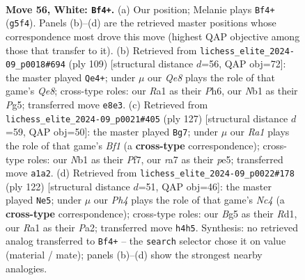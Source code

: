 \documentclass[11pt]{article}
\begin{document}
\clearpage

\begin{figure}[p]\centering
\begin{subfigure}{0.46\textwidth}\centering
\resizebox{\linewidth}{!}{%
\newchessgame
\chessboard[
  setfen={1qb1Q3/r7/3k4/p2p1pB1/P6P/8/8/RN4K1 w - - 2 56},
  showmover=false,
  pgfstyle=straightmove, color=movearrow, markmove={g5-f4}
]}
\caption{}
\end{subfigure}\hfill
\begin{subfigure}{0.46\textwidth}\centering
\resizebox{\linewidth}{!}{%
\newchessgame
\chessboard[
  setfen={8/1p6/6kp/6p1/P7/6QP/5P2/3rq1BK b - - 0 55},
  showmover=false,
  pgfstyle=straightmove, color=movearrow, markmove={e1-e4}
]}
\caption{}
\end{subfigure}
\\[4pt]
\begin{subfigure}{0.46\textwidth}\centering
\resizebox{\linewidth}{!}{%
\newchessgame
\chessboard[
  setfen={5bk1/5p2/7p/1p2PQ1P/3P4/8/q1B2K2/8 b - - 0 64},
  showmover=false,
  pgfstyle=straightmove, color=movearrow, markmove={f8-g7}
]}
\caption{}
\end{subfigure}\hfill
\begin{subfigure}{0.46\textwidth}\centering
\resizebox{\linewidth}{!}{%
\newchessgame
\chessboard[
  setfen={8/4r2k/p6p/3Q1bq1/2NP4/5P2/PP3K2/3R4 w - - 30 62},
  showmover=false,
  pgfstyle=straightmove, color=movearrow, markmove={c4-e5}
]}
\caption{}
\end{subfigure}
\caption{\textbf{Move 56, White: \texttt{Bf4+}.} (a) Our position; Melanie plays \texttt{Bf4+} (\texttt{g5f4}). Panels (b)--(d) are the retrieved master positions whose correspondence most drove this move (highest QAP objective among those that transfer to it). (b) Retrieved from \texttt{lichess\_elite\_2024-09\_p0018\#694} (ply 109) [structural distance $d$=56, QAP obj=72]: the master played \texttt{Qe4+}; under $\mu$ our \emph{Qe8} plays the role of that game's \emph{Qe8}; cross-type roles: our \emph{R}a1 as their \emph{P}h6, our \emph{N}b1 as their \emph{P}g5; transferred move \texttt{e8e3}. (c) Retrieved from \texttt{lichess\_elite\_2024-09\_p0021\#405} (ply 127) [structural distance $d$=59, QAP obj=50]: the master played \texttt{Bg7}; under $\mu$ our \emph{Ra1} plays the role of that game's \emph{Bf1} (a \textbf{cross-type} correspondence); cross-type roles: our \emph{N}b1 as their \emph{P}f7, our \emph{r}a7 as their \emph{p}e5; transferred move \texttt{a1a2}. (d) Retrieved from \texttt{lichess\_elite\_2024-09\_p0022\#178} (ply 122) [structural distance $d$=51, QAP obj=46]: the master played \texttt{Ne5}; under $\mu$ our \emph{Ph4} plays the role of that game's \emph{Nc4} (a \textbf{cross-type} correspondence); cross-type roles: our \emph{B}g5 as their \emph{R}d1, our \emph{R}a1 as their \emph{P}a2; transferred move \texttt{h4h5}. Synthesis: no retrieved analog transferred to \texttt{Bf4+} -- the \texttt{search} selector chose it on value (material / mate); panels (b)--(d) show the strongest nearby analogies.}
\label{fig:thought-m110}
\end{figure}
\end{document}
